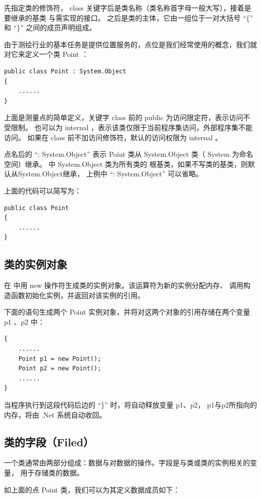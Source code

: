 先指定类的修饰符， class 关键字后是类名称（类名称首字母一般大写），接着是要继承的基类
与需实现的接口。
之后是类的主体，它由一组位于一对大括号 ``\{'' 和 ``\}'' 之间的成员声明组成。

由于测绘行业的基本任务是提供位置服务的，点位是我们经常使用的概念，我们就对它来定义一个类 Point ：

\begin{lstlisting}
public class Point : System.Object
{
    ......
}
\end{lstlisting}

上面是测量点的简单定义，关键字 class 前的 public 为访问限定符，表示访问不受限制。 
也可以为 internal ，表示该类仅限于当前程序集访问，外部程序集不能访问。
如果在 class 前不加访问修饰符，默认的访问权限为 internal 。

点名后的 ``: System.Object'' 表示 Point 类从 System.Object 类（ System 为命名空间）继承。
\cs 中 System.Object 类为所有类的 根基类，如果不写类的基类，则默认从System.Object继承，
上例中 ``: System.Object'' 可以省略。

上面的代码可以简写为：
\begin{lstlisting}
public class Point
{
    ......
}
\end{lstlisting}

\subsection{类的实例对象}

在 \cs 中用 new 操作符生成类的实例对象。该运算符为新的实例分配内存、
调用构造函数初始化实例，并返回对该实例的引用。

下面的语句生成两个 Point 实例对象，并将对这两个对象的引用存储在两个变量 p1 、p2 中：

\begin{lstlisting}
{
    ......
    Point p1 = new Point();
    Point p2 = new Point();
    ......
}
\end{lstlisting}

当程序执行到这段代码后边的 ``\}'' 时，将自动释放变量 p1、p2，
p1与p2所指向的内存，将由 .Net 系统自动收回。

\subsection{类的字段（Filed）}
一个类通常由两部分组成：数据与对数据的操作。字段是与类或类的实例相关的变量，
用于存储类的数据。

如上面的点 Point 类，我们可以为其定义数据成员如下：


